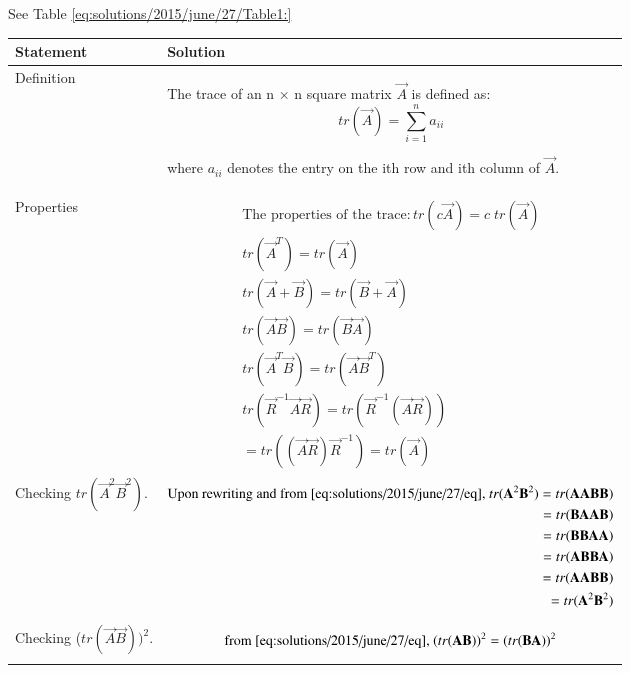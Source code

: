 See Table \ref{eq:solutions/2015/june/27/Table1:}

\onecolumn
\begin{longtable}{|p{5cm}|p{13cm}|}
\hline
\textbf{Statement} &\textbf{Solution}\\
\hline
Definition & The trace of an n × n square matrix $\vec{A}$ is defined as:
\begin{displaymath}tr({\vec{A}}) = \sum_{i=1}^n a_{ii} \end{displaymath}

where $a_{ii}$ denotes the entry on the ith row and ith column of $\vec{A}.$ \\
\hline
Properties&
\parbox{12cm}{\begin{align}\text{The properties of the trace}:
tr(c{\vec{A}})=c\;tr({\vec{A}})\\
tr({\vec{A}}^T)=tr({\vec{A}})\\
tr({\vec{A}}+{\vec{B}})=tr({\vec{B}}+{\vec{A}})\\
tr({\vec{A}}{\vec{B}})=tr({\vec{B}}{\vec{A}})\label{eq:solutions/2015/june/27/eq}\\
tr({\vec{A}}^T{\vec{B}})=tr({\vec{A}}{\vec{B}}^T)\\
tr({\vec{R}}^{-1}{\vec{A}}{\vec{R}})=tr({\vec{R}}^{-1}({\vec{A}}{\vec{R}}))\\
=tr(({\vec{A}}{\vec{R}}){\vec{R}}^{-1})=tr({\vec{A}})
\end{align}}\\
\hline
Checking $tr$$(\vec{A}^2 \vec{B}^2).$ &
\parbox{12cm}{\begin{align}
 \text{Upon rewriting and from \eqref{eq:solutions/2015/june/27/eq}, } tr(\vec{A}^2 \vec{B}^2)=tr(\vec{A}\vec{A} \vec{B}\vec{B})\\
           = tr(\vec{B}\vec{A} \vec{A}\vec{B})\\
           = tr(\vec{B}\vec{B} \vec{A}\vec{A})\\
           = tr(\vec{A}\vec{B} \vec{B}\vec{A})\label{eq:solutions/2015/june/27/eq1}\\
           = tr(\vec{A}\vec{A} \vec{B}\vec{B})\\
           = tr(\vec{A}^2 \vec{B}^2)\label{eq:solutions/2015/june/27/eq2}
\end{align}}\\
\hline
Checking ($tr$$(\vec{A} \vec{B}))^2.$&
\parbox{12cm}{\begin{align}\text{from \eqref{eq:solutions/2015/june/27/eq},}\
    (tr(\vec{A} \vec{B}))^2=(tr(\vec{B} \vec{A}))^2
\end{align}}\\

\end{longtable}
